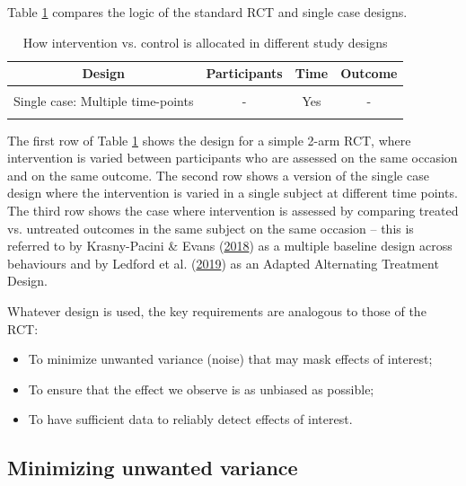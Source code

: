 \documentclass{krantz}
\providecommand{\tightlist}{%
\setlength{\itemsep}{0pt}\setlength{\parskip}{0pt}}
\begin{document}
Table \ref{tab:scdlogic} compares the logic of the standard RCT and single case designs.

\begin{table}

\caption{\label{tab:scdlogic}How intervention vs. control is allocated in different study designs}
\centering
\begin{tabular}[t]{cccc}
\toprule
Design & Participants & Time & Outcome\\
\midrule
\cellcolor{gray!6}{RCT: Multiple participants} & \cellcolor{gray!6}{Yes} & \cellcolor{gray!6}{-} & \cellcolor{gray!6}{-}\\
Single case: Multiple time-points & - & Yes & -\\
\cellcolor{gray!6}{Single case: Multiple outcomes} & \cellcolor{gray!6}{-} & \cellcolor{gray!6}{-} & \cellcolor{gray!6}{Yes}\\
\bottomrule
\end{tabular}
\end{table}

The first row of Table \ref{tab:scdlogic} shows the design for a simple 2-arm RCT, where intervention is varied between participants who are assessed on the same occasion and on the same outcome. The second row shows a version of the single case design where the intervention is varied in a single subject at different time points. The third row shows the case where intervention is assessed by comparing treated vs. untreated outcomes in the same subject on the same occasion -- this is referred to by Krasny-Pacini \& Evans (\protect\hyperlink{ref-krasny-pacini2018}{2018}) as a multiple baseline design across behaviours and by Ledford et al. (\protect\hyperlink{ref-ledford2019}{2019}) as an Adapted Alternating Treatment Design.

Whatever design is used, the key requirements are analogous to those of the RCT:

\begin{itemize}
\tightlist
\item
  To minimize unwanted variance (noise) that may mask effects of interest;
\item
  To ensure that the effect we observe is as unbiased as possible;
\item
  To have sufficient data to reliably detect effects of interest.
\end{itemize}

\hypertarget{minimizing-unwanted-variance}{%
\subsection{Minimizing unwanted variance}\label{minimizing-unwanted-variance}}
\end{document}
